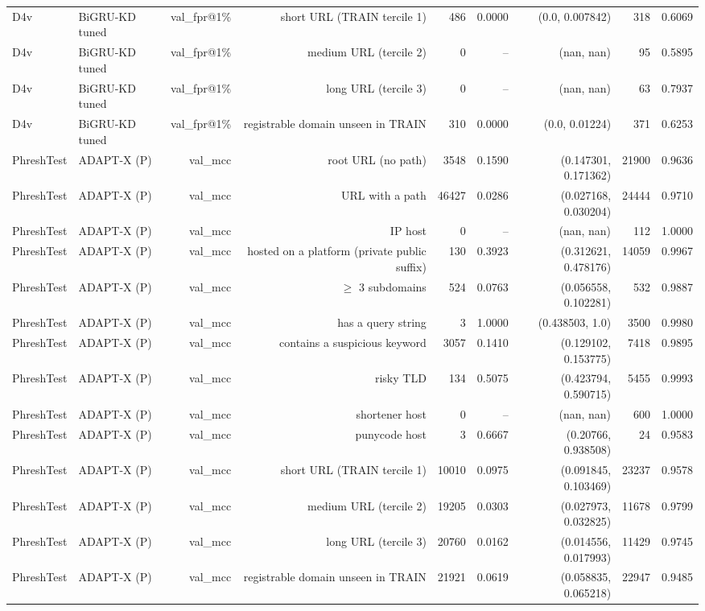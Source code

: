\begin{table}[t]
\begin{tabular}{llrrrrrrr}
D4v & BiGRU-KD tuned & val\_fpr@1\% & short URL (TRAIN tercile 1) & 486 & 0.0000 & (0.0, 0.007842) & 318 & 0.6069 \\
D4v & BiGRU-KD tuned & val\_fpr@1\% & medium URL (tercile 2) & 0 & -- & (nan, nan) & 95 & 0.5895 \\
D4v & BiGRU-KD tuned & val\_fpr@1\% & long URL (tercile 3) & 0 & -- & (nan, nan) & 63 & 0.7937 \\
D4v & BiGRU-KD tuned & val\_fpr@1\% & registrable domain unseen in TRAIN & 310 & 0.0000 & (0.0, 0.01224) & 371 & 0.6253 \\
PhreshTest & ADAPT-X (P) & val\_mcc & root URL (no path) & 3548 & 0.1590 & (0.147301, 0.171362) & 21900 & 0.9636 \\
PhreshTest & ADAPT-X (P) & val\_mcc & URL with a path & 46427 & 0.0286 & (0.027168, 0.030204) & 24444 & 0.9710 \\
PhreshTest & ADAPT-X (P) & val\_mcc & IP host & 0 & -- & (nan, nan) & 112 & 1.0000 \\
PhreshTest & ADAPT-X (P) & val\_mcc & hosted on a platform (private public suffix) & 130 & 0.3923 & (0.312621, 0.478176) & 14059 & 0.9967 \\
PhreshTest & ADAPT-X (P) & val\_mcc & $\geq$ 3 subdomains & 524 & 0.0763 & (0.056558, 0.102281) & 532 & 0.9887 \\
PhreshTest & ADAPT-X (P) & val\_mcc & has a query string & 3 & 1.0000 & (0.438503, 1.0) & 3500 & 0.9980 \\
PhreshTest & ADAPT-X (P) & val\_mcc & contains a suspicious keyword & 3057 & 0.1410 & (0.129102, 0.153775) & 7418 & 0.9895 \\
PhreshTest & ADAPT-X (P) & val\_mcc & risky TLD & 134 & 0.5075 & (0.423794, 0.590715) & 5455 & 0.9993 \\
PhreshTest & ADAPT-X (P) & val\_mcc & shortener host & 0 & -- & (nan, nan) & 600 & 1.0000 \\
PhreshTest & ADAPT-X (P) & val\_mcc & punycode host & 3 & 0.6667 & (0.20766, 0.938508) & 24 & 0.9583 \\
PhreshTest & ADAPT-X (P) & val\_mcc & short URL (TRAIN tercile 1) & 10010 & 0.0975 & (0.091845, 0.103469) & 23237 & 0.9578 \\
PhreshTest & ADAPT-X (P) & val\_mcc & medium URL (tercile 2) & 19205 & 0.0303 & (0.027973, 0.032825) & 11678 & 0.9799 \\
PhreshTest & ADAPT-X (P) & val\_mcc & long URL (tercile 3) & 20760 & 0.0162 & (0.014556, 0.017993) & 11429 & 0.9745 \\
PhreshTest & ADAPT-X (P) & val\_mcc & registrable domain unseen in TRAIN & 21921 & 0.0619 & (0.058835, 0.065218) & 22947 & 0.9485 \\

\end{tabular}
\end{table}
